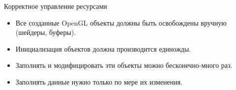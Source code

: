 \documentclass[aspectration=1610,t]{beamer}
\begin{document}
\begin{frame}[fragile]{Корректное управление ресурсами}
    \begin{itemize}
        \item Все созданные OpenGL объекты должны быть освобождены вручную (шейдеры, буферы).
        \item Инициализация объектов должна производится единожды.
        \item Заполнять и модифицировать эти объекты можно бесконечно-много раз.
        \item Заполнять данные нужно только по мере их изменения.
    \end{itemize}
\end{frame}
\end{document}
